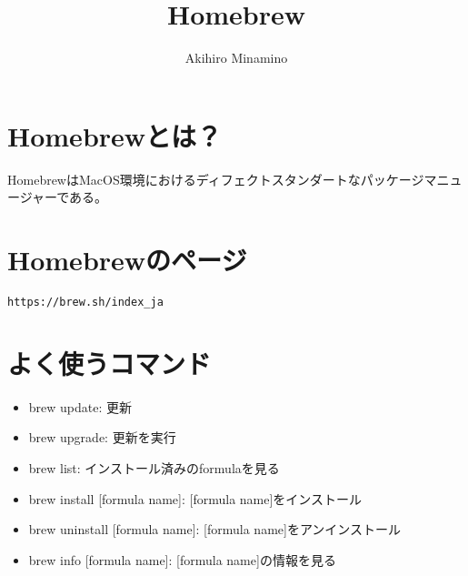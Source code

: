 \documentclass[11pt, oneside]{article}   	%
\title{Homebrew}
\author{Akihiro Minamino}
\begin{document}
\maketitle

\section{Homebrewとは？}
HomebrewはMacOS環境におけるディフェクトスタンダートなパッケージマニュージャーである。\\

\section{Homebrewのページ}
\verb|https://brew.sh/index_ja|\\

\section{よく使うコマンド}
\begin{itemize}
\item brew update: 更新
\item brew upgrade: 更新を実行
\item brew list: インストール済みのformulaを見る
\item brew install [formula name]: [formula name]をインストール
\item brew uninstall [formula name]: [formula name]をアンインストール
\item brew info [formula name]: [formula name]の情報を見る
\end{itemize}

\end{document}
